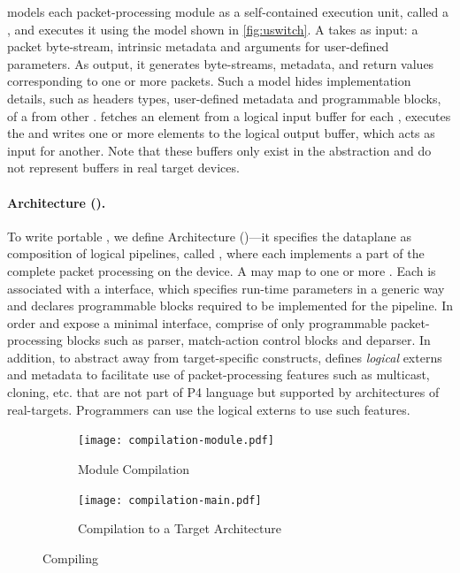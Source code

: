 \documentclass[letterpaper,twocolumn,10pt]{article}
\begin{document}
\uswitch models each packet-processing module as a self-contained
 execution unit, called a \emph{\uprogram}, and
executes it using the model shown in \cref{fig:uswitch}. A \uprogram
takes as input: a packet byte-stream, intrinsic metadata and arguments
for user-defined parameters. As output, it generates byte-streams,
metadata, and return values corresponding to one or more packets. Such
a model hides implementation details, such as headers types,
user-defined metadata and programmable blocks, of a \uprogram from
other \uprograms.  \uswitch fetches an element from a logical input
buffer for each \uprogram, executes the \uprogram and writes one or
more elements to the logical output buffer, which acts as input for
another. Note that these buffers only exist in the abstraction and do
not represent buffers in real target devices.

\paragraph{\uswitch Architecture (\uarch).}
To write portable \uprograms, we define \uswitch Architecture
(\uarch)---it specifies the dataplane as composition of logical
pipelines, called \emph{\upipeline}, where each \upipeline implements
a part of the complete packet processing on the device. A \upipeline
may map to one or more \uprograms. Each \upipeline is associated with
a \uarch interface, which specifies run-time parameters in a generic
way and declares programmable blocks required to be implemented for
the pipeline. In order 
 and
expose a minimal interface, \upipelines comprise of only programmable
packet-processing blocks such as parser, match-action control blocks
and deparser. In addition, to abstract away from target-specific
constructs, \uarch defines \emph{logical} externs and metadata to
facilitate use of packet-processing features such as multicast,
cloning, etc. that are not part of P4 language but supported by
architectures of real-targets. Programmers can use the logical externs
to use such features.

\begin{figure}[tbh]
    \begin{subfigure}{\linewidth}
        \centering
        \texttt{[image: compilation-module.pdf]}
         \caption{Module Compilation}
         \label{subfig:module-compilation}
    \end{subfigure}
    \begin{subfigure}{\linewidth}
        \centering
        \texttt{[image: compilation-main.pdf]}
        \caption{Compilation to a Target Architecture}
        \label{subfig:compilation-to-target-architecture}
    \end{subfigure}
    \caption{Compiling \uprograms}
\end{figure}
\end{document}
